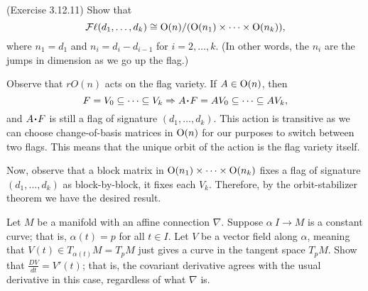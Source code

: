 \documentclass[12pt]{memoir}
\begin{document}
\begin{Ej}
    (Exercise 3.12.11) Show that 
	\[
		\operatorname{\mathcal{F}\ell}(d_1, \dots, d_k) \cong \mathrm{O}(n)/(\mathrm{O}(n_1) \times \dots \times \mathrm{O}(n_k)),
	\]
	where $n_1 = d_1$ and $n_i = d_i - d_{i-1}$ for $i=2, \dots , k$. (In other words, the $n_i$ are the jumps in dimension as we go up the flag.)
\end{Ej}

\begin{ptcbr}
	Observe that $rO(n)$ acts on the flag variety. If $A\in\mathrm{O}(n)$, then
	$$F=V_0\subysub V_k\To A\.F=AV_0\subysub AV_k,$$
	and $A\.F$ is still a flag of signature $(d_1,\dots,d_k)$. This action is transitive as we can choose change-of-basis matrices in $\mathrm{O}(n)$ for our purposes to switch between two flags. This means that the unique orbit of the action is the flag variety itself.\par
	Now, observe that a block matrix in $\mathrm{O}(n_1)\times\cdots\times\mathrm{O}(n_k)$ fixes a flag of signature $(d_1,\dots,d_k)$ as block-by-block, it fixes each $V_k$. Therefore, by the orbit-stabilizer theorem we have the desired result.
\end{ptcbr}
\begin{Ej}
	Let $M$ be a manifold with an affine connection $\nabla$. Suppose $\alpha \: I \to M$ is a constant curve; that is, $\alpha(t) = p$ for all $t \in I$. Let $V$ be a vector field along $\alpha$, meaning that $V(t) \in T_{\alpha(t)}M = T_p M$ just gives a curve in the tangent space $T_pM$. Show that $\frac{DV}{dt} = V'(t)$; that is, the covariant derivative agrees with the usual derivative in this case, regardless of what $\nabla$ is.
\end{Ej}
\end{document}
